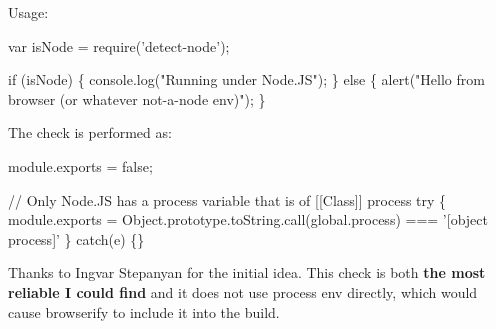 Usage\+: 
\begin{DoxyCode}
var isNode = require('detect-node');

if (isNode) \{
  console.log("Running under Node.JS");
\} else \{
  alert("Hello from browser (or whatever not-a-node env)");
\}
\end{DoxyCode}


The check is performed as\+: 
\begin{DoxyCode}
module.exports = false;

// Only Node.JS has a process variable that is of [[Class]] process
try \{
 module.exports = Object.prototype.toString.call(global.process) === '[object process]' 
\} catch(e) \{\}
\end{DoxyCode}


Thanks to Ingvar Stepanyan for the initial idea. This check is both {\bfseries the most reliable I could find} and it does not use {\ttfamily process} env directly, which would cause browserify to include it into the build. 